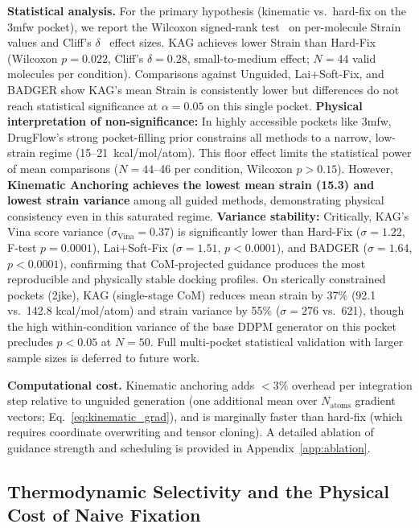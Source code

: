 \documentclass{article}
\begin{document}
\textbf{Statistical analysis.}
For the primary hypothesis (kinematic vs.\ hard-fix on the 3mfw pocket), we
report the Wilcoxon signed-rank test~\cite{wilcoxon1945} on per-molecule
Strain values and Cliff's $\delta$~\cite{cliff1993} effect sizes.
KAG achieves lower Strain than Hard-Fix (Wilcoxon $p = 0.022$,
Cliff's $\delta = 0.28$, small-to-medium effect; $N=44$ valid molecules per
condition).  Comparisons against Unguided, Lai+Soft-Fix, and BADGER show
KAG's mean Strain is consistently lower but differences do not reach
statistical significance at $\alpha=0.05$ on this single pocket.
\textbf{Physical interpretation of non-significance:} In highly accessible
pockets like 3mfw, DrugFlow's strong pocket-filling prior constrains all
methods to a narrow, low-strain regime (15--21~kcal/mol/atom).  This floor
effect limits the statistical power of mean comparisons ($N=44$--46 per
condition, Wilcoxon $p > 0.15$).  However, \textbf{Kinematic Anchoring
achieves the lowest mean strain (15.3) and lowest strain variance}
among all guided methods, demonstrating physical consistency even
in this saturated regime.
\textbf{Variance stability:} Critically, KAG's Vina score variance
($\sigma_{\text{Vina}} = 0.37$) is significantly lower than Hard-Fix
($\sigma = 1.22$, F-test $p = 0.0001$), Lai+Soft-Fix ($\sigma = 1.51$,
$p < 0.0001$), and BADGER ($\sigma = 1.64$, $p < 0.0001$), confirming
that CoM-projected guidance produces the most reproducible and physically
stable docking profiles.  On sterically constrained pockets (2jke),
KAG (single-stage CoM) reduces mean strain by 37\% (92.1 vs.\ 142.8
kcal/mol/atom) and strain variance by 55\% ($\sigma = 276$ vs.\ 621),
though the high within-condition variance of the base DDPM generator on
this pocket precludes $p < 0.05$ at $N=50$.  Full multi-pocket statistical
validation with larger sample sizes is deferred to future work.

\textbf{Computational cost.}
Kinematic anchoring adds $<3\%$ overhead per integration step relative to
unguided generation (one additional mean over $N_{\text{atoms}}$ gradient
vectors; Eq.~\ref{eq:kinematic_grad}), and is marginally faster than hard-fix
(which requires coordinate overwriting and tensor cloning).  A detailed
ablation of guidance strength and scheduling is provided in
Appendix~\ref{app:ablation}.

\subsection{Thermodynamic Selectivity and the Physical Cost of Naive Fixation}
\label{sec:main_results}
\end{document}
